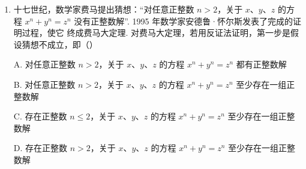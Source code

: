\documentclass[a4paper,11pt]{article}
\begin{document}
\begin{enumerate}

\ifanswer
\solbegin
{}
\solend

\fi

\item 十七世纪，数学家费马提出猜想：“对任意正整数 $n>2$，关于 $x$、$y$、$z$ 的方程
$x^n+y^n=z^n$ 没有正整数解”. 1995 年数学家安德鲁·怀尔斯发表了完成的证明过程，使它
终成费马大定理. 对费马大定理，若用反证法证明，第一步是假设猜想不成立，即\mbox{（\quad）}

\keepwithprev
A. 对任意正整数 $n>2$，关于 $x$、$y$、$z$ 的方程 $x^n+y^n=z^n$ 都有正整数解

B. 对任意正整数 $n>2$，关于 $x$、$y$、$z$ 的方程 $x^n+y^n=z^n$ 至少存在一组正整数解

C. 存在正整数 $n\leqslant2$，关于 $x$、$y$、$z$ 的方程 $x^n+y^n=z^n$ 至少存在一组正整数解

D. 存在正整数 $n>2$，关于 $x$、$y$、$z$ 的方程 $x^n+y^n=z^n$ 至少存在一组正整数解


\end{enumerate}

\end{document}
